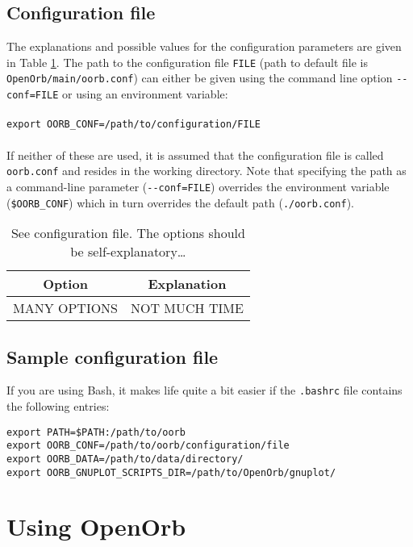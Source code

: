 \documentclass[12pt,english,twoside,a4paper]{report}
\begin{document}
\section{Configuration file}

The explanations and possible values for the configuration parameters
are given in Table \ref{table:conf}. The path to the configuration
file \verb|FILE| (path to default file is
\verb|OpenOrb/main/oorb.conf|) can either be given using the command
line option \verb|--conf=FILE| or using an environment variable:
\\ \\ \verb|export OORB_CONF=/path/to/configuration/FILE| \\ \\ If
neither of these are used, it is assumed that the configuration file
is called \verb|oorb.conf| and resides in the working directory. Note
that specifying the path as a command-line parameter
(\verb|--conf=FILE|) overrides the environment variable
(\verb|$OORB_CONF|) which in turn overrides the default path
(\verb|./oorb.conf|).

\begin{table}\label{table:conf}
\centering
\begin{tabular}{cc}
\hline
Option & Explanation \\
\hline
MANY OPTIONS & NOT MUCH TIME \\
\hline
\end{tabular}
\caption{See configuration file. The options should be self-explanatory\ldots}  
\end{table}



\section{Sample configuration file}

If you are using Bash, it makes life quite a bit easier if the
\verb|.bashrc| file contains the following entries:
\begin{verbatim}
export PATH=$PATH:/path/to/oorb
export OORB_CONF=/path/to/oorb/configuration/file
export OORB_DATA=/path/to/data/directory/
export OORB_GNUPLOT_SCRIPTS_DIR=/path/to/OpenOrb/gnuplot/
\end{verbatim}



\chapter{Using OpenOrb}
\end{document}
